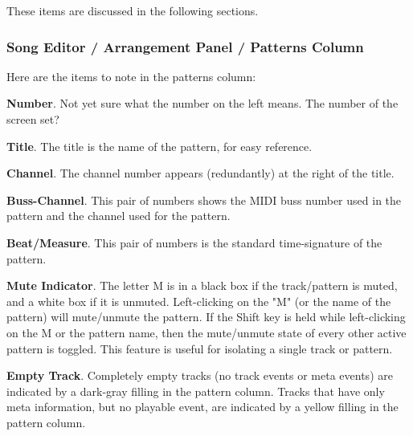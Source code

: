    These items are discussed in the following sections.

\subsubsection{Song Editor / Arrangement Panel / Patterns Column}
\label{subsubsec:seq64_song_editor_arrangement_panel_patterns_column}

   Here are the items to note in the patterns column:

   \begin{enumber}
      \item \textbf{Number}.
         Not yet sure what the number on the left means.
         The number of the screen set?
      \item \textbf{Title}.
         The title is the name of the pattern, for easy reference.
      \item \textbf{Channel}.
         The channel number appears (redundantly)
         at the right of the title.
      \item \textbf{Buss-Channel}.
         This pair of numbers shows the MIDI buss number used in the pattern
         and the channel used for the pattern.
      \item \textbf{Beat/Measure}.
         This pair of numbers is the standard time-signature of the pattern.
      \item \textbf{Mute Indicator}.
         The letter M is in a black box if the track/pattern is muted, and a
         white box if it is unmuted.
         Left-clicking on the "M" (or the name of the pattern)
         will mute/unmute the pattern.
         If the Shift key is held while left-clicking on the M or the pattern
         name, then
         the mute/unmute state of every other active pattern is toggled.
         This feature is useful for isolating a single track or pattern.
      \item \textbf{Empty Track}.
         Completely empty tracks (no track events or meta events)
         are indicated by a dark-gray filling in the pattern column.
         Tracks that have only meta information, but no playable event, are
         indicated by a yellow filling in the pattern column.
   \end{enumber}

